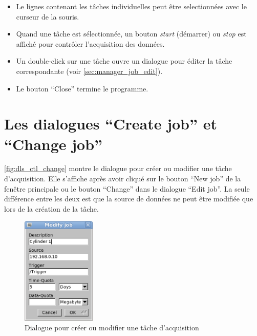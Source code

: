 \documentclass[a4paper,12pt,BCOR6mm,bibtotoc,idxtotoc]{scrbook}
\begin{document}
\begin{itemize}

\item Le lignes contenant les t\^aches individuelles peut \^etre
  selectionn\'ees avec le curseur de la souris.

\item Quand une t\^ache est s\'electionn\'ee, un bouton \textit{start}
  (démarrer) ou \textit{stop} est affich\'e pour contr\^oler
  l'acquisition des donn\'ees.

\item Un double-click sur une t\^ache ouvre un dialogue
  pour \'editer la t\^ache correspondante (voir
  \autoref{sec:manager_job_edit}).

\item Le bouton ``Close'' termine le programme.

\end{itemize}


\section{Les dialogues ``Create job'' et ``Change job''}
\label{sec:manager_job_create}

\autoref{fig:dls_ctl_change} montre le dialogue pour
cr\'eer ou modifier une t\^ache d'acquisition. Elle s'affiche apr\`es
avoir cliqu\'e sur le bouton ``New job'' de la fen\^etre principale ou
le bouton ``Change'' dans le dialogue ``Edit job''.  La
seule diff\'erence entre les deux est que la source de donn\'ees ne
peut \^etre modifi\'ee que lors de la cr\'eation de la t\^ache.

\begin{figure}[tbh]
  \begin{center}
    \includegraphics[width=100pt]{bilder/ctl_change_en}
  \end{center}
  \caption{Dialogue pour cr\'eer ou modifier une t\^ache
    d'acquisition}
  \label{fig:dls_ctl_change}
\end{figure}
\end{document}
